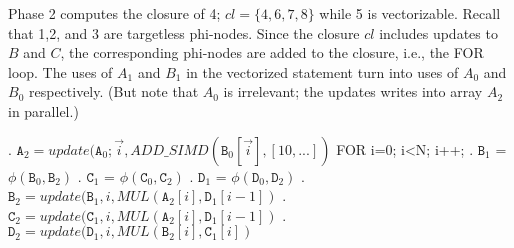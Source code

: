 \documentclass[sigconf, screen, natbib=false, dvipsnames, table]{acmart}
\theoremstyle{definition}
\begin{document}
Phase 2 computes the closure of 4; $cl = \{4,6,7, 8\}$ 
while 5 is vectorizable. Recall that 1,2, and 3 are targetless phi-nodes. Since the closure $cl$ includes updates to $B$ and $C$,
the corresponding phi-nodes are added to the closure, i.e., the FOR loop. The uses of $A_1$ and $B_1$ in the vectorized statement
turn into uses of $A_0$ and $B_0$ respectively. (But note that $A_0$ is irrelevant; the updates writes into array $A_2$ in parallel.)

\begin{algorithmic}
. $\texttt{A}_2 = update(\texttt{A}_0; \stackrel{\rightarrow}{i}, \mathit{ADD\_SIMD}(\texttt{B}_0[\stackrel{\rightarrow}i],[10,...])$ 
\STATE FOR i=0; i<N; i++; 
. $\texttt{B}_1$ = $\phi(\texttt{B}_0,\texttt{B}_2)$
. $\texttt{C}_1$ = $\phi(\texttt{C}_0,\texttt{C}_2)$
. $\texttt{D}_1$ = $\phi(\texttt{D}_0,\texttt{D}_2)$
. $\texttt{B}_2 = update(\texttt{B}_1, i, \mathit{MUL}(\texttt{A}_2[i], \texttt{D}_1[{i-1}])$
. $\texttt{C}_2 = update(\texttt{C}_1, i, \mathit{MUL}(\texttt{A}_2[i], \texttt{D}_1[{i-1}])$
. $\texttt{D}_2 = update(\texttt{D}_1, i, \mathit{MUL}(\texttt{B}_2[i], \texttt{C}_1[i])$
\end{algorithmic}

\end{document}
